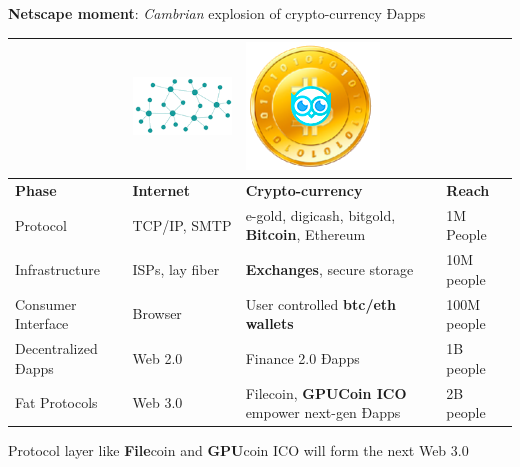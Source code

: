 \textbf{Netscape moment}: \emph{Cambrian} explosion of crypto-currency Ðapps
 

 \begin{adjustbox}{width=.75\textwidth}
\begin{tabularx} {\textwidth}{|X|X|X|X|}
 \hline
& \includegraphics[scale=0.2]{static/decentnew} & \includegraphics[scale=0.2]{static/hootcoin} & \\
 \hline
\textbf{Phase} & \textbf{Internet} & \textbf{Crypto-currency} & \textbf{Reach}\\
\hline
Protocol & TCP/IP, SMTP & e-gold, digicash, bitgold, \textbf{Bitcoin}, Ethereum & 1M People \\
\hline
Infrastructure & ISPs, lay fiber & \textbf{Exchanges}, secure storage & 10M people \\
\hline
Consumer Interface & Browser & User controlled \textbf{btc/eth wallets} & 100M people \\
\hline
Decentralized Ðapps & Web 2.0 & Finance 2.0 Ðapps & 1B people\\
\hline
Fat Protocols & Web 3.0 & Filecoin, \textbf{GPUCoin ICO} empower next-gen Ðapps & 2B people\\

\hline
\end{tabularx}
\end{adjustbox}

Protocol layer like \textbf{File}coin and \textbf{GPU}coin ICO will form the next Web 3.0